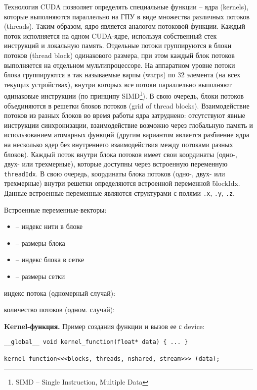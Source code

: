 Технология CUDA позволяет определять специальные функции – ядра (kernels), которые выполняются параллельно на ГПУ в виде множества различных потоков (threads). Таким образом, ядро является аналогом потоковой функции. Каждый поток исполняется на одном CUDA-ядре, используя собственный стек инструкций и локальную память. Отдельные потоки группируются в блоки потоков (thread block) одинакового размера, при этом каждый блок потоков выполняется на отдельном мультипроцессоре.
На аппаратном уровне потоки блока группируются в так называемые варпы (warps) по 32 элемента (на всех текущих устройствах), внутри которых все потоки параллельно выполняют одинаковые инструкции (по принципу SIMD\footnote{SIMD -- Single Instruction, Multiple Data}).
В свою очередь, блоки потоков объединяются в решетки блоков потоков (grid of thread blocks). Взаимодействие потоков из разных блоков во время работы ядра затруднено: отсутствуют явные инструкции синхронизации, взаимодействие возможно через глобальную память и использованием атомарных функций (другим вариантом является разбиение ядра на несколько ядер без внутреннего взаимодействия между потоками разных блоков).
Каждый поток внутри блока потоков имеет свои координаты (одно-, двух- или трехмерные), которые доступны через встроенную переменную \texttt{threadIdx}. В свою очередь, координаты блока потоков (одно-, двух- или трехмерные) внутри решетки определяются встроенной переменной \v{blockIdx}. Данные встроенные переменные являются структурами с полями \texttt{.x}, \texttt{.y}, \texttt{.z}.

Встроенные переменные-векторы:
\begin{itemize}
    \item{} -- индекс нити в блоке
    \item{} -- размеры блока
    \item{} -- индекс блока в сетке
    \item{} -- размеры сетки
\end{itemize}

 индекс потока (одномерный случай): 

 количество потоков (одном. случай): 

\textbf{Kernel-функция.} Пример создания функции и вызов ее с device:
\begin{verbatim}
__global__ void kernel_function(float* data) { ... }

kernel_function<<<blocks, threads, nshared, stream>>> (data);
\end{verbatim}

